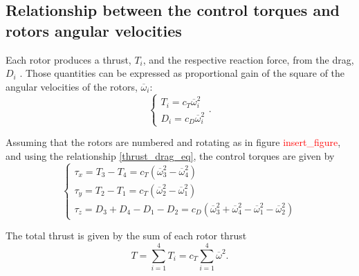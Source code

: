 	\subsection{Relationship between the control torques and rotors angular velocities}
		Each rotor produces a thrust, $T_i$, and the respective reaction force, from the drag, $D_i$ \cite{vijay_quad_modelling}. Those quantities can be expressed as proportional gain of the square of the angular velocities of the rotors, $\overline{\omega}_i$:
		\begin{equation}
			\left \{
				\begin{array}{l}
					T_i = c_T \displaystyle \overline{\omega}_i^2 \\
					D_i = c_D \displaystyle \overline{\omega}_i^2
				\end{array}
				\right . .
			\label{thrust_drag_eq}
		\end{equation}
		
		Assuming that the rotors are numbered and rotating as in figure \textcolor{red}{insert\_figure}, and using the relationship \eqref{thrust_drag_eq}, the control torques are given by
		\begin{equation}
			\left \{
				\begin{array}{l}
					\tau_x = T_3 - T_4 = c_T \displaystyle \left ( \overline{\omega}_3^2 - \overline{\omega}_4^2 \right )\\
					\tau_y = T_2 - T_1 = c_T \displaystyle \left ( \overline{\omega}_2^2 - \overline{\omega}_1^2 \right )\\
					\tau_z = D_3 + D_4 - D_1 - D_2 = c_D \displaystyle \left ( \overline{\omega}_3^2 + \overline{\omega}_4^2 - \overline{\omega}_1^2 - \overline{\omega}_2^2 \right)
				\end{array}
			\right .
			\label{control_torques}
		\end{equation}
		
		The total thrust is given by the sum of each rotor thrust
		\begin{equation}
			T = \sum_{i=1}^4 T_i = c_T \sum_{i=1}^4 \overline{\omega}^2.
			\label{thrust}
		\end{equation}
		
